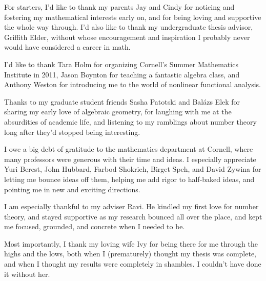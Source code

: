 \documentclass[phd,cornellheadings,tocprelim]{cornell}
\begin{document}
\begin{acknowledgements}
For starters, I'd like to thank my parents Jay and Cindy for noticing and 
fostering my mathematical interests early on, and for being loving and 
supportive the whole way through. I'd also like to thank my undergraduate 
thesis advisor, Griffith Elder, without whose encouragement and inspiration 
I probably never would have considered a career in math. 

I'd like to thank Tara Holm for organizing Cornell's Summer Mathematics 
Institute in 2011, Jason Boynton for teaching a fantastic algebra class, and 
Anthony Weston for introducing me to the world of nonlinear functional 
analysis. 

Thanks to my graduate student friends Sasha Patotski and Bal\'azs Elek for 
sharing my early love of algebraic geometry, for laughing with me at the 
absurdities of academic life, and listening to my ramblings about number 
theory long after they'd stopped being interesting. 

I owe a big debt of gratitude to the mathematics department at Cornell, where 
many professors were generous with their time and ideas. I especially 
appreciate Yuri Berest, John Hubbard, Farbod Shokrieh, Birget Speh, and David 
Zywina for letting me bounce ideas off them, helping me add rigor to 
half-baked ideas, and pointing me in new and exciting directions. 

I am especially thankful to my adviser Ravi. He kindled my first love for 
number theory, and stayed supportive as my research bounced all over the place, 
and kept me focused, grounded, and concrete when I needed to be. 

Most importantly, I thank my loving wife Ivy for being there for me 
through the highs and the lows, both when I (prematurely) thought my thesis was 
complete, and when I thought my results were completely in shambles. I couldn't 
have done it without her. 
\end{acknowledgements}

\contentspage
\normalspacing
\setcounter{page}{1}
\pagestyle{cornell}
\addtolength{\parskip}{0.5\baselineskip}











%
%






\printbibliography[heading=bibintoc]
\end{document}
